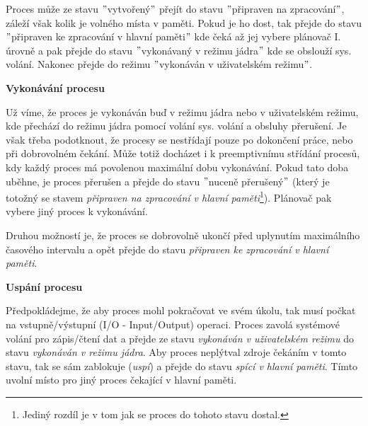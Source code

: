 \vspace{0,5cm}

Proces může ze stavu $"$vytvořený$"$ přejít do stavu $"$připraven na zpracování$"$, záleží však kolik je volného místa v paměti. Pokud je ho dost, tak přejde do stavu $"$připraven ke zpracování v hlavní paměti$"$ kde čeká až jej vybere plánovač I. úrovně a pak přejde do stavu $"$vykonávaný v režimu jádra$"$ kde se obslouží sys. volání. Nakonec přejde do režimu $"$vykonáván v uživatelském režimu$"$.

\begin{large}
    \vspace{0,5cm}
    \textbf{Vykonávání procesu}
\end{large}

Už víme, že proces je vykonáván buď v režimu jádra nebo v uživatelském režimu, kde přechází do režimu jádra pomocí volání sys. volání a obsluhy přerušení. Je však třeba podotknout, že procesy se nestřídají pouze po dokončení práce, nebo při dobrovolném čekání. Může totiž docházet i k preemptivnímu střídání procesů, kdy každý proces má povolenou maximální dobu vykonávání. Pokud tato doba uběhne, je proces přerušen a přejde do stavu $"$nuceně přerušený$"$ (který je totožný se stavem \textit{připraven na zpracování v hlavní paměti}\footnote{Jediný rozdíl je v tom jak se proces do tohoto stavu dostal.}). Plánovač pak vybere jiný proces k vykonávání. 

\vspace{0,5cm}

Druhou možností je, že proces se dobrovolně ukončí před uplynutím maximálního časového intervalu a opět přejde do stavu \textit{připraven ke zpracování v hlavní paměti}.

\begin{large}
    \vspace{0,5cm}
    \textbf{Uspání procesu}
\end{large}

Předpokládejme, že aby proces mohl pokračovat ve svém úkolu, tak musí počkat na vstupně/výstupní (I/O - Input/Output) operaci. Proces zavolá systémové volání pro zápis/čtení dat a přejde ze stavu \textit{vykonáván v uživatelském režimu} do stavu \textit{vykonáván v režimu jádra}. Aby proces neplýtval zdroje čekáním v tomto stavu, tak se sám zablokuje (\textit{uspí}) a přejde do stavu \textit{spící v hlavní paměti}. Tímto uvolní místo pro jiný proces čekající v hlavní paměti. 

\vspace{0,5cm}

